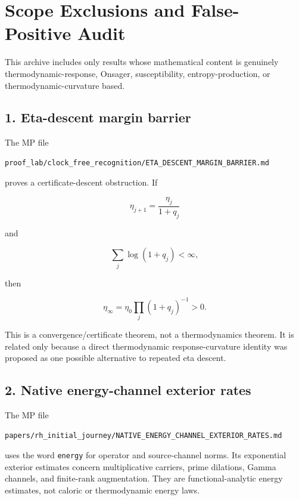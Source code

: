 \hypertarget{scope-exclusions-and-false-positive-audit}{%
\chapter{Scope Exclusions and False-Positive Audit}\label{scope-exclusions-and-false-positive-audit}}

This archive includes only results whose mathematical content is genuinely thermodynamic-response, Onsager, susceptibility, entropy-production, or thermodynamic-curvature based.

\hypertarget{eta-descent-margin-barrier}{%
\section{1. Eta-descent margin barrier}\label{eta-descent-margin-barrier}}

The MP file

\begin{verbatim}
proof_lab/clock_free_recognition/ETA_DESCENT_MARGIN_BARRIER.md
\end{verbatim}

proves a certificate-descent obstruction. If

\[
\eta_{j+1}=\frac{\eta_j}{1+q_j}
\]

and

\[
\sum_j\log(1+q_j)<\infty,
\]

then

\[
\eta_\infty
=\eta_0\prod_j(1+q_j)^{-1}>0.
\]

This is a convergence/certificate theorem, not a thermodynamics theorem. It is related only because a direct thermodynamic response-curvature identity was proposed as one possible alternative to repeated eta descent.

\hypertarget{native-energy-channel-exterior-rates}{%
\section{2. Native energy-channel exterior rates}\label{native-energy-channel-exterior-rates}}

The MP file

\begin{verbatim}
papers/rh_initial_journey/NATIVE_ENERGY_CHANNEL_EXTERIOR_RATES.md
\end{verbatim}

uses the word \texttt{energy} for operator and source-channel norms. Its exponential exterior estimates concern multiplicative carriers, prime dilations, Gamma channels, and finite-rank augmentation. They are functional-analytic energy estimates, not caloric or thermodynamic energy laws.

